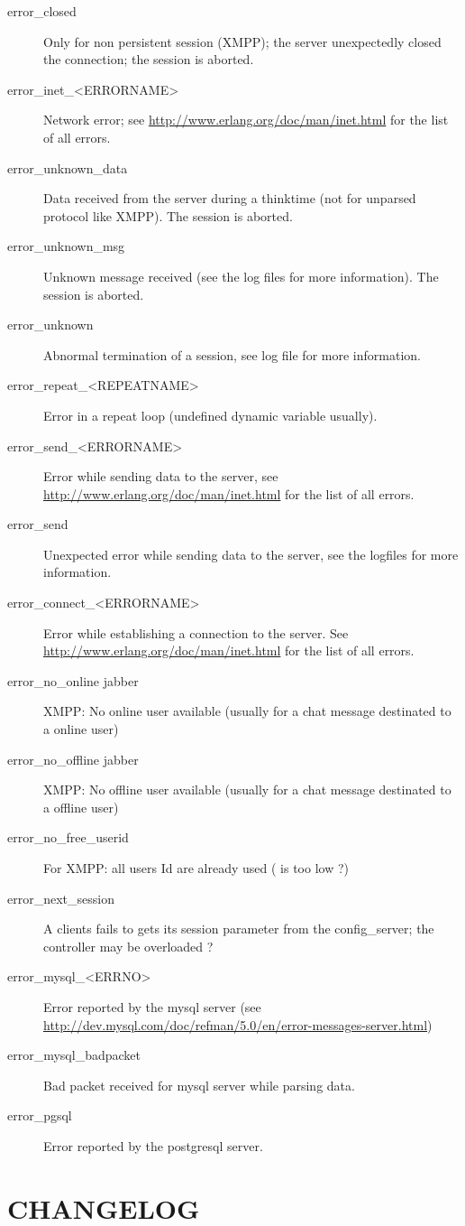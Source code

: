 \documentclass{TSUNG-en}
\begin{document}
\begin{appendix}
\begin{description}
\item[error\_closed] Only for non persistent session (XMPP); the
  server unexpectedly closed the connection; the session is aborted.
\item[error\_inet\_<ERRORNAME>] Network error; see
  \url{http://www.erlang.org/doc/man/inet.html} for the list of all errors.
\item[error\_unknown\_data] Data received from the server during a
  thinktime (not for unparsed protocol like XMPP). The session is
  aborted.
\item[error\_unknown\_msg] Unknown message received (see the log
  files for more information). The session is aborted.
\item[error\_unknown] Abnormal termination of a session, see
  log file for more information.
\item[error\_repeat\_<REPEATNAME>] Error in a repeat loop (undefined
  dynamic variable usually).
\item[error\_send\_<ERRORNAME>] Error while sending data to the
  server, see  \url{http://www.erlang.org/doc/man/inet.html} for the list of all errors.
\item[error\_send] Unexpected error while sending data to the server,
  see the logfiles for more information.
\item[error\_connect\_<ERRORNAME>] Error while establishing a
  connection to the server.  See  \url{http://www.erlang.org/doc/man/inet.html} for the list of all errors.
\item[error\_no\_online jabber] XMPP: No online user available (usually for a
  chat message destinated to a online user)
\item[error\_no\_offline jabber] XMPP: No offline user available (usually for a
  chat message destinated to a offline user)
\item[error\_no\_free\_userid] For XMPP: all users Id are already used
  ( is too low ?)
\item[error\_next\_session] A clients fails to gets its session
  parameter from the config\_server; the controller may be overloaded ?
\item[error\_mysql\_<ERRNO>] Error reported by the mysql server (see \url{http://dev.mysql.com/doc/refman/5.0/en/error-messages-server.html})
\item[error\_mysql\_badpacket] Bad packet received for mysql server while parsing data.
\item[error\_pgsql] Error reported by the postgresql server.
\end{description}

\section{CHANGELOG}
\end{appendix}
\end{document}
